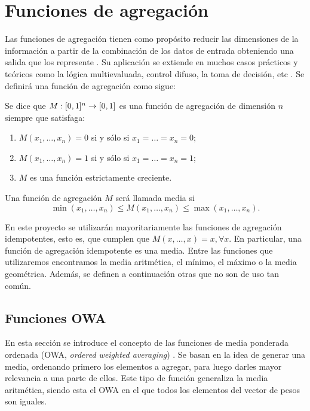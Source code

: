 \documentclass[main]{subfiles}
\begin{document}
\section{Funciones de agregación}\label{sec:agregacion}
Las funciones de agregación tienen como propósito reducir las dimensiones de la información a partir de la combinación de los datos de entrada obteniendo una salida que los represente \cite{art:montero, art:calvoagregacion}. Su aplicación se extiende en muchos casos prácticos y teóricos como la lógica multievaluada, control difuso, la toma de decisión, etc \cite{art:paternain}.  Se definirá una función de agregación como sigue:

\begin{definition}\label{def:agregacion}
Se dice que ${M : [0,1]^n \rightarrow [0,1]}$ es una función de agregación de dimensión $n$ siempre que satisfaga:
	\begin{enumerate}
	\item $M(x_1, \dots, x_n) = 0$ si y sólo si $x_1=\dots=x_n=0$;
	\item $M(x_1, \dots, x_n) = 1$ si y sólo si $x_1=\dots=x_n=1$;
	\item $M$ es una función estrictamente creciente.
	\end{enumerate}
\end{definition}
\begin{definition}
Una función de agregación $M$ será llamada media si
$$ \min(x_{1}, \dots, x_{n})  \leq M(x_{1}, \dots, x_{n}) \leq \max(x_{1}, \dots, x_{n}).$$
\end{definition}

En este proyecto se utilizarán mayoritariamente las funciones de agregación idempotentes, esto es, que cumplen que $M(x,\dots ,x)=x, \forall x$. En particular, una función de agregación idempotente es una media. Entre las funciones que utilizaremos encontramos la media aritmética, el mínimo, el máximo o la media geométrica. Además, se definen a continuación otras que no son de uso tan común.
\subsection{Funciones OWA}
En esta sección se introduce el concepto de las funciones de media ponderada ordenada (OWA, {\em  ordered weighted averaging}) \cite{art:yagerowa, art:paternain, art:bustinceowa}. Se basan en la idea de generar una media, ordenando primero los elementos a agregar, para luego darles mayor relevancia a una parte de ellos. Este tipo de función generaliza la media aritmética, siendo esta el OWA en el que todos los elementos del vector de pesos son iguales.
\end{document}
